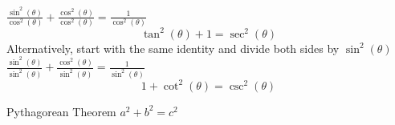 \documentclass{article}
\begin{document}
	\(\frac{\sin^2(\theta)}{\cos^2(\theta)} + \frac{\cos^2(\theta)}{\cos^2(\theta)} = \frac{1}{\cos^2(\theta)}\)\\
\begin{equation}
	\tan^2(\theta) + 1 = \sec^2(\theta)
\end{equation}
	Alternatively, start with the same identity and divide both sides by \(\sin^2(\theta)\)\\
	
	\(\frac{\sin^2(\theta)}{\sin^2(\theta)} + \frac{\cos^2(\theta)}{\sin^2(\theta)} = \frac{1}{\sin^2(\theta)}\)\\
\begin{equation}
	1 + \cot^2(\theta) = \csc^2(\theta)
\end{equation}

	Pythagorean Theorem
	\(a^2 + b^2 = c^2\)
	
\end{document}
